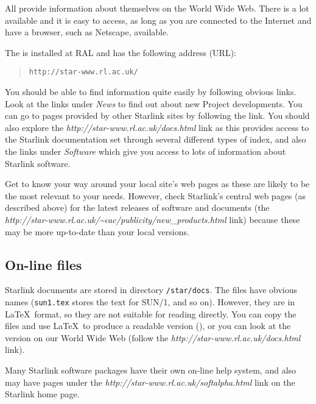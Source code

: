 All
provide information about themselves on the World Wide Web.
There is a lot available and it is easy to access, as long as you are
connected to the Internet and have a browser, such as Netscape, available.

The
is installed at RAL and has the following address (URL):
\begin{quote}
{\tt http://star-www.rl.ac.uk/}
\end{quote}
You should be able to find information quite easily by following obvious
links.
Look at the links under {\em News}\/ to find out about new
Project developments.
You can go to pages provided by other Starlink sites by following the
{\em {}}\/ link.
You should also explore the
{\em {}
{http://star-www.rl.ac.uk/docs.html}}\/
link as this provides access to the Starlink documentation set through
several different types of index, and also the links under {\em Software}\/
which give you access to lots of information about Starlink software.

Get to know your way around your local site's web pages as these are likely to
be the most relevant to your needs.
However, check Starlink's central web pages (as described above) for the
latest releases of software and documents (the
{\em {}
{http://star-www.rl.ac.uk/\~{}cac/publicity/new_products.html}}\/
link)
because these may be more up-to-date than your local versions.

\subsection{On-line files}

Starlink documents are stored in directory {\tt /star/docs}.
The files have obvious names ({\tt sun1.tex} stores the text for SUN/1, and so
on).
However, they are in \LaTeX\ format, so they are not suitable for reading
directly.
You can copy the files and use \LaTeX\ to produce a readable version
(), 
or you can look at the version on our World Wide Web (follow the
{\em {}
{http://star-www.rl.ac.uk/docs.html}}\/
link).

Many Starlink software packages have their own on-line help system, and also
may have pages under the
{\em {}
{http://star-www.rl.ac.uk/softalpha.html}}\/ 
link on the Starlink home page.

